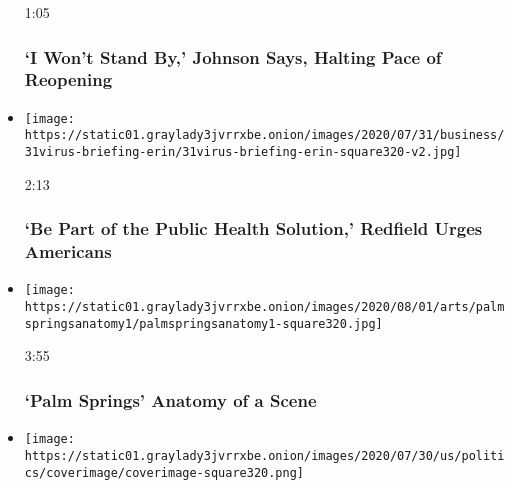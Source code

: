 \begin{itemize}
  1:05

  \hypertarget{i-wont-stand-by-johnson-says-halting-pace-of-reopening}{%
  \subsubsection{`I Won't Stand By,' Johnson Says, Halting Pace of
  Reopening}\label{i-wont-stand-by-johnson-says-halting-pace-of-reopening}}
\item
  \href{https://www.nytimes3xbfgragh.onion/video/us/politics/100000007266691/fauci-congress-testimony.html?action=click\&module=video-series-bar\&region=header\&pgtype=Article\&playlistId=video/latest-video}{}

  \texttt{[image: https://static01.graylady3jvrrxbe.onion/images/2020/07/31/business/31virus-briefing-erin/31virus-briefing-erin-square320-v2.jpg]}

  2:13

  \hypertarget{be-part-of-the-public-health-solution-redfield-urges-americans}{%
  \subsubsection{`Be Part of the Public Health Solution,' Redfield Urges
  Americans}\label{be-part-of-the-public-health-solution-redfield-urges-americans}}
\item
  \href{https://www.nytimes3xbfgragh.onion/video/movies/100000007265338/palm-springs-scene.html?action=click\&module=video-series-bar\&region=header\&pgtype=Article\&playlistId=video/latest-video}{}

  \texttt{[image: https://static01.graylady3jvrrxbe.onion/images/2020/08/01/arts/palmspringsanatomy1/palmspringsanatomy1-square320.jpg]}

  3:55

  \hypertarget{palm-springs--anatomy-of-a-scene}{%
  \subsubsection{`Palm Springs' \textbar{} Anatomy of a
  Scene}\label{palm-springs--anatomy-of-a-scene}}
\item
  \href{https://www.nytimes3xbfgragh.onion/video/us/politics/100000007265038/trump-inhofe-audio-call.html?action=click\&module=video-series-bar\&region=header\&pgtype=Article\&playlistId=video/latest-video}{}

  \texttt{[image: https://static01.graylady3jvrrxbe.onion/images/2020/07/30/us/politics/coverimage/coverimage-square320.png]}


\end{itemize}
